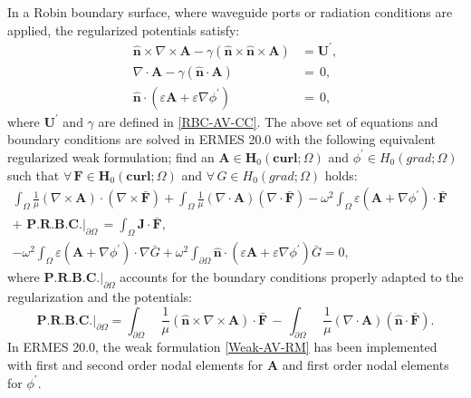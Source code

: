 In a Robin boundary surface, where waveguide ports or radiation conditions are applied, the regularized potentials satisfy:
\begin{equation}
	\begin{aligned}
		\mathbf{\hat{n}}\times\nabla\times\mathbf{A} - \gamma(\mathbf{\hat{n}}\times\mathbf{\hat{n}}\times\mathbf{A}) &= \mathbf{U}^{'},
		\\
		\nabla\cdot\mathbf{A} - \gamma\left(\mathbf{\hat{n}}\cdot\mathbf{A}\right) &= \,0,
		\\
		\mathbf{\hat{n}}\cdot\left(\varepsilon\mathbf{A} + \varepsilon\nabla\phi^{'}\right) &= \,0,
	\end{aligned}
\end{equation}
where $\mathbf{U}^{'}$ and $\gamma$ are defined in \ref{RBC-AV-CC}. The above set of equations and boundary conditions are solved in ERMES 20.0 with the following equivalent regularized weak formulation; find an $\mathbf{A} \in \mathbf{H}_{0}(\mathbf{curl};\Omega)$ and $\phi^{'} \in H_{0}(grad;\Omega)$ such
that $\forall\,\mathbf{F} \in \mathbf{H}_{0}(\mathbf{curl};\Omega)$ and $\forall\,G \in H_{0}(grad;\Omega)$ holds:
\begin{equation}\label{Weak-AV-RM}
	\begin{aligned}
		\int_{\Omega}\frac{1}{\mu}(\nabla\times\mathbf{A})\cdot(\nabla\times\mathbf{\bar{F}}) + \int_{\Omega}\frac{1}{\mu}(\nabla\cdot\mathbf{A})(\nabla\cdot\mathbf{\bar{F}})- \omega^{2}\int_{\Omega}\varepsilon\left(\mathbf{A} + \nabla\phi^{'}\right)\cdot\mathbf{\bar{F}}\,&
		\\ 
		+\,\,\textbf{P.R.B.C.}|_{\partial\Omega}\, = \int_{\Omega}\mathbf{J}\cdot\mathbf{\bar{F}},&
		\\
		-\omega^{2}\int_{\Omega}\varepsilon\left(\mathbf{A} + \nabla\phi^{'}\right)\cdot\nabla\bar{G} + \omega^{2}\int_{\partial\Omega}\mathbf{\hat{n}}\cdot\left(\varepsilon\mathbf{A} + \varepsilon\nabla\phi^{'}\right)\bar{G} = 0,&	
	\end{aligned}
\end{equation}
where $\textbf{P.R.B.C.}|_{\partial\Omega}$ accounts for the boundary conditions properly adapted to the regularization and the potentials:
\begin{equation}
	\textbf{P.R.B.C.}|_{\partial\Omega} = \int_{\partial\Omega}\enspace\frac{1}{\mu}\left(\mathbf{\hat{n}}\times\nabla\times\mathbf{A}\right)\cdot\mathbf{\bar{F}}\, - \,\int_{\partial\Omega}\enspace\frac{1}{\mu}(\nabla\cdot\mathbf{A})(\mathbf{\hat{n}}\cdot\mathbf{\bar{F}}).
\end{equation}
In ERMES 20.0, the weak formulation \ref{Weak-AV-RM} has been implemented with first and second order nodal elements for \textbf{A} and first order nodal elements for $\phi^{'}$. 

